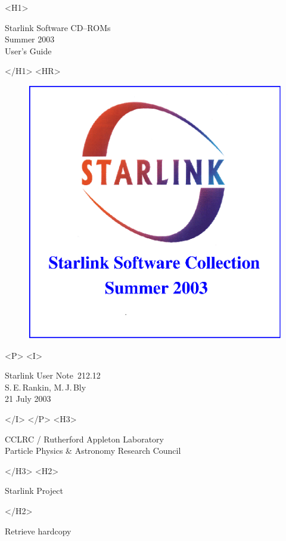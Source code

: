\documentclass[twoside,11pt]{article}
\newcommand{\stardoccategory}  {Starlink User Note}
\newcommand{\stardocsource}    {sun\stardocnumber}
\newcommand{\stardocnumber}    {212.12}
\newcommand{\stardocauthors}   {S.\,E.\,Rankin, M.\,J.\,Bly}
\newcommand{\stardocdate}      {21 July 2003}
\newcommand{\stardoctitle}     {Starlink Software CD--ROMs}
\newcommand{\stardocversion}   {Summer 2003}
\newcommand{\stardocmanual}    {User's Guide}
\newcommand{\htmladdnormallink}[2]{#1}
\newcommand{\htmladdimg}[1]{}
\newcommand{\xlabel}[1]{}
\renewcommand{\_}{\texttt{\symbol{95}}}
\begin{document}
\begin{htmlonly}
   \xlabel{}
   \begin{rawhtml} <H1> \end{rawhtml}
      \stardoctitle\\
      \stardocversion\\
      \stardocmanual
   \begin{rawhtml} </H1> <HR> \end{rawhtml}

  \begin{figure}[h]
  \includegraphics[scale=0.7]{sun212_cover}
  \end{figure}

   \begin{rawhtml} <P> <I> \end{rawhtml}
   \stardoccategory\ \stardocnumber \\
   \stardocauthors \\
   \stardocdate
   \begin{rawhtml} </I> </P> <H3> \end{rawhtml}
      \htmladdnormallink{CCLRC / Rutherford Appleton Laboratory}
                        {http://www.cclrc.ac.uk} \\
      \htmladdnormallink{Particle Physics \& Astronomy Research Council}
                        {http://www.pparc.ac.uk} \\
   \begin{rawhtml} </H3> <H2> \end{rawhtml}
      \htmladdnormallink{Starlink Project}{http://www.starlink.ac.uk/}
   \begin{rawhtml} </H2> \end{rawhtml}
   \htmladdnormallink{\htmladdimg{source.gif} Retrieve hardcopy}
      {http://www.starlink.ac.uk/cgi-bin/hcserver?\stardocsource}\\


\end{htmlonly}
\end{document}
